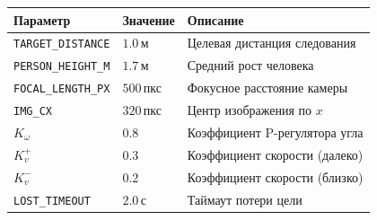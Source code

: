 \begin{center}
\begin{tabular}{lll}
\toprule
\textbf{Параметр} & \textbf{Значение} & \textbf{Описание}\\
\midrule
\texttt{TARGET\_DISTANCE}  & $1.0\,\text{м}$ & Целевая дистанция следования\\
\texttt{PERSON\_HEIGHT\_M} & $1.7\,\text{м}$ & Средний рост человека\\
\texttt{FOCAL\_LENGTH\_PX} & $500\,\text{пкс}$ & Фокусное расстояние камеры\\
\texttt{IMG\_CX}           & $320\,\text{пкс}$ & Центр изображения по $x$\\
$K_\omega$                  & $0.8$ & Коэффициент P-регулятора угла\\
$K_v^+$                     & $0.3$ & Коэффициент скорости (далеко)\\
$K_v^-$                     & $0.2$ & Коэффициент скорости (близко)\\
\texttt{LOST\_TIMEOUT}     & $2.0\,\text{с}$ & Таймаут потери цели\\
\bottomrule
\end{tabular}
\end{center}
